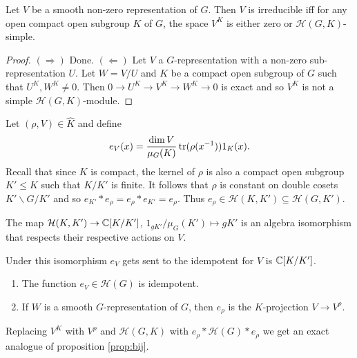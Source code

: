 \documentclass{memoir}
\begin{document}
\begin{corollary}
    Let $V$ be a smooth non-zero representation of $G$.
    Then $V$ is irreducible iff for any open compact open subgroup $K$ of $G$, the space $V^K$ is either zero or $\mathcal H(G,K)$-simple.
\end{corollary}
\begin{proof}
    $(\Rightarrow)$ Done.
    $(\Leftarrow)$ Let $V$ a $G$-representation with a non-zero sub-representation $U$.
    Let $W = V/U$ and $K$ be a compact open subgroup of $G$ such that $U^K, W^K \ne 0$.
    Then $0\to U^K\to V^K\to W^K\to 0$ is exact and so $V^K$ is not a simple $\mathcal H(G,K)$-module.
\end{proof}
\begin{definition}
    Let $(\rho,V) \in \hat K$ and define
    \begin{equation}
        e_V(x) = \frac{\dim V}{\mu_G(K)}\operatorname{tr}(\rho(x^{-1})) 1_K(x).
    \end{equation}
    Recall that since $K$ is compact, the kernel of $\rho$ is also a compact open subgroup $K'\le K$ such that $K/K'$ is finite.
    It follows that $\rho$ is constant on double cosets $K'\backslash G/K'$ and so $e_{K'}*e_{\rho} = e_\rho*e_{K'} = e_\rho$.
    Thus $e_\rho\in \mathcal H(K,K')\subseteq \mathcal H(G,K')$.
\end{definition}
\begin{proposition}
    The map $\mathcal H(K,K')\to \mathbb{C}[K/K']$, $1_{gK'}/\mu_G(K')\mapsto gK'$ is an algebra isomorphism that respects their respective actions on $V$.
\end{proposition}
\begin{remark}
    Under this isomorphism $e_V$ gets sent to the idempotent for $V$ is $\mathbb{C}[K/K']$.
\end{remark}
\begin{corollary}
    \begin{enumerate}
        \item The function $e_V\in \mathcal H(G)$ is idempotent.
        \item If $W$ is a smooth $G$-representation of $G$, then $e_\rho$ is the $K$-projection $V\to V^\rho$.
    \end{enumerate}
\end{corollary}
\begin{remark}
    Replacing $V^K$ with $V^\rho$ and $\mathcal H(G,K)$ with $e_\rho*\mathcal H(G)*e_\rho$ we get an exact analogue of proposition \ref{prop:bij}.
\end{remark}
\end{document}

